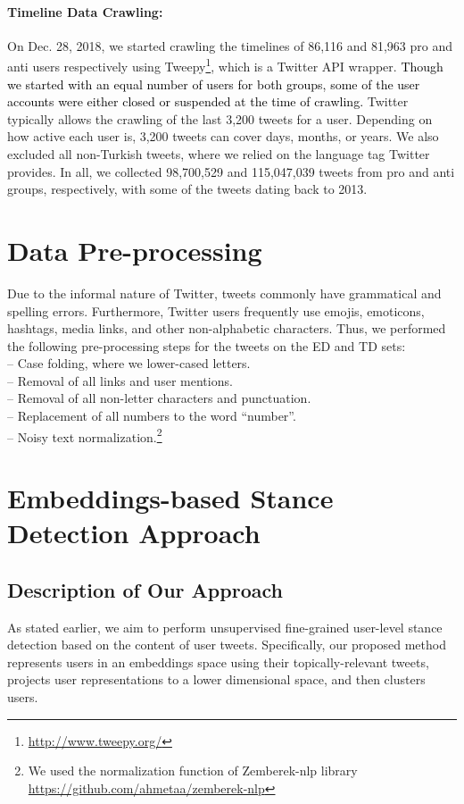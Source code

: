 \documentclass[letterpaper]{article} \usepackage{aaai20}  \usepackage{times}  \usepackage{stackengine}
\newcommand{\kareem}{\textcolor{black}}
\begin{document}
\paragraph{\textbf{Timeline Data Crawling:}}\label{sec_timeline_crawling} 
On Dec. 28, 2018, we started crawling the timelines of 86,116 and 81,963 pro and anti users respectively using Tweepy\footnote{\url{http://www.tweepy.org/}}, which is a Twitter API wrapper. \kareem{Though we started with an equal number of users for both groups, some of the user accounts were either closed or suspended at the time of crawling.}  Twitter typically allows the crawling of the last 3,200 tweets for a user. Depending on how active each user is, 3,200 tweets can cover days, months, or years. We also excluded all non-Turkish tweets, where we relied on the language tag Twitter provides. In all, we collected 98,700,529 and 115,047,039 tweets from pro and anti groups, respectively, with some of the tweets dating back to 2013.



\section{Data Pre-processing}
Due to the informal nature of Twitter, tweets commonly have grammatical and spelling errors.  Furthermore, Twitter users frequently use emojis, emoticons, hashtags, media links, and other non-alphabetic characters. Thus, we performed the following pre-processing steps for the tweets on the ED and TD sets:\\ -- Case folding, where we lower-cased letters.\\
-- Removal of all links and user mentions.\\
-- Removal of all non-letter characters and punctuation. \\ -- Replacement of all numbers to the word ``number''. \\
-- Noisy text normalization.\footnote{We used the normalization function of Zemberek-nlp library \url{https://github.com/ahmetaa/zemberek-nlp}}






\section{Embeddings-based Stance Detection Approach}
\subsection{Description of Our Approach}
As stated earlier, we aim to perform unsupervised fine-grained user-level stance detection based on the content of user tweets. Specifically, our proposed method represents users in an embeddings space using their topically-relevant tweets, projects user representations to a lower dimensional space, and then clusters users. 
\end{document}
